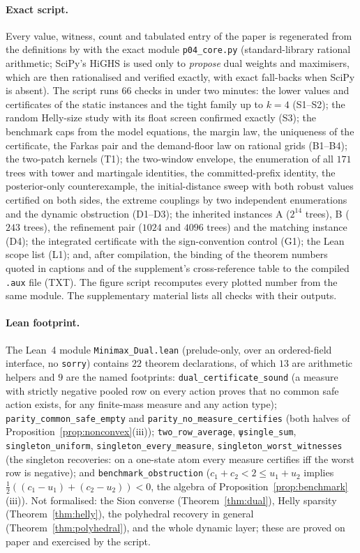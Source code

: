 \documentclass[11pt,a4paper]{article}
\theoremstyle{plain}
\theoremstyle{definition}
\theoremstyle{remark}
\newcommand{\tfr}[2]{\tfrac{#1}{#2}}
\begin{document}
\paragraph{Exact script.} Every value, witness, count and tabulated entry of the paper is regenerated from the definitions by  with the exact module \texttt{p04\_core.py} (standard-library rational arithmetic; SciPy's HiGHS is used only to \emph{propose} dual weights and maximisers, which are then rationalised and verified exactly, with exact fall-backs when SciPy is absent). The script runs $66$ checks in under two minutes: the lower values and certificates of the static instances and the tight family up to $k=4$ (S1--S2); the random Helly-size study with its float screen confirmed exactly (S3); the benchmark caps from the model equations, the margin law, the uniqueness of the certificate, the Farkas pair and the demand-floor law on rational grids (B1--B4); the two-patch kernels (T1); the two-window envelope, the enumeration of all $171$ trees with tower and martingale identities, the committed-prefix identity, the posterior-only counterexample, the initial-distance sweep with both robust values certified on both sides, the extreme couplings by two independent enumerations and the dynamic obstruction (D1--D3); the inherited instances A ($2^{14}$ trees), B ($243$ trees), the refinement pair ($1024$ and $4096$ trees) and the matching instance (D4); the integrated certificate with the sign-convention control (G1); the Lean scope list (L1); and, after compilation, the binding of the theorem numbers quoted in captions and of the supplement's cross-reference table to the compiled \texttt{.aux} file (TXT). The figure script recomputes every plotted number from the same module. The supplementary material lists all checks with their outputs.

\paragraph{Lean footprint.} The Lean~4 module \cite{deMoura2021} \texttt{Minimax\_Dual.lean} (prelude-only, over an ordered-field interface, no \texttt{sorry}) contains $22$ theorem declarations, of which $13$ are arithmetic helpers and $9$ are the named footprints: \texttt{dual\_certificate\_sound} (a measure with strictly negative pooled row on every action proves that no common safe action exists, for any finite-mass measure and any action type); \texttt{parity\_common\_safe\_empty} and \texttt{parity\_no\_measure\_certifies} (both halves of Proposition~\ref{prop:nonconvex}(iii)); \texttt{two\_row\_average}, \texttt{ψsingle\_sum}, \texttt{singleton\_uniform}, \texttt{singleton\_every\_measure}, \texttt{singleton\_worst\_witnesses} (the singleton recoveries: on a one-state atom every measure certifies iff the worst row is negative); and \texttt{benchmark\_obstruction} ($c_1+c_2<2\le u_1+u_2$ implies $\tfr12((c_1-u_1)+(c_2-u_2))<0$, the algebra of Proposition~\ref{prop:benchmark}(iii)). Not formalised: the Sion converse (Theorem~\ref{thm:dual}), Helly sparsity (Theorem~\ref{thm:helly}), the polyhedral recovery in general (Theorem~\ref{thm:polyhedral}), and the whole dynamic layer; these are proved on paper and exercised by the script.
\end{document}
